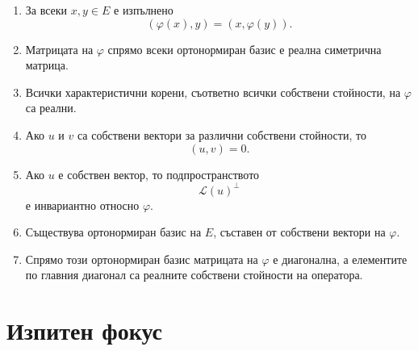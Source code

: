 \begin{enumerate}
\item За всеки $x,y\in E$ е изпълнено
\[
(\varphi(x),y)=(x,\varphi(y)).
\]

\item Матрицата на $\varphi$ спрямо всеки ортонормиран базис е реална симетрична матрица.

\item Всички характеристични корени, съответно всички собствени стойности, на $\varphi$ са реални.

\item Ако $u$ и $v$ са собствени вектори за различни собствени стойности, то
\[
(u,v)=0.
\]

\item Ако $u$ е собствен вектор, то подпространството
\[
\mathcal{L}(u)^\perp
\]
е инвариантно относно $\varphi$.

\item Съществува ортонормиран базис на $E$, съставен от собствени вектори на $\varphi$.

\item Спрямо този ортонормиран базис матрицата на $\varphi$ е диагонална, а елементите по главния диагонал са реалните собствени стойности на оператора.
\end{enumerate}

\section{Изпитен фокус}\label{s:30.7}

